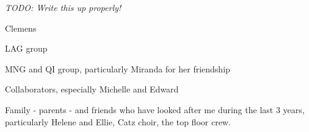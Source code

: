 
\begin{acknowledgements}      


\textit{TODO: Write this up properly!}

Clemens

LAG group

MNG and QI group, particularly Miranda for her friendship

Collaborators, especially Michelle and Edward

Family - parents - and friends who have looked after me during the last 3 years, particularly Helene and Ellie, Catz choir, the top floor crew.

\end{acknowledgements}
